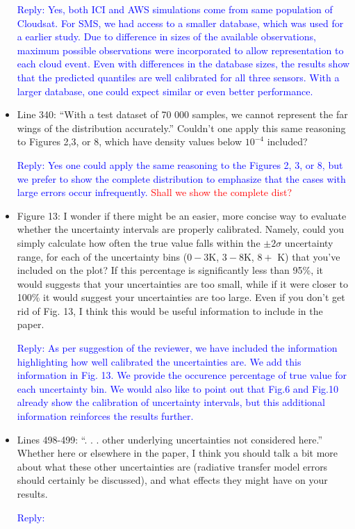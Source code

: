 \documentclass[11pt,a4paper,draft]{article}
\begin{document}
\begin{itemize}
\textcolor{blue}{Reply: Yes, both ICI and AWS simulations come from same population of Cloudsat. For SMS, we had access to a smaller database, which was used for a earlier study. Due to difference in sizes of the available observations, maximum possible observations were incorporated to allow  representation to each cloud event. Even with differences in the database sizes, the results show that the predicted quantiles are well calibrated for all three sensors. With a larger database, one could expect similar or even better performance.}

\item  
			Line 340: ``With a test dataset of 70 000 samples, we cannot represent the far wings of the distribution accurately.'' Couldn't one apply this same reasoning to Figures 2,3, or
			8, which have density values below $10^{-4}$ included?

\textcolor{blue}{Reply: Yes one could apply the same reasoning to the Figures 2, 3, or 8, but we prefer to show the complete distribution to emphasize that the cases with large errors occur infrequently. \textcolor{red}{Shall we show the complete dist?}}


\item 
			Figure 13: I wonder if there might be an easier, more concise way to evaluate whether
			the uncertainty intervals are properly calibrated. Namely, could you simply calculate
			how often the true value falls within the $\pm2\sigma$ uncertainty range, for each of the uncertainty bins ($0 - 3$K, $3 - 8$K, $8 +$ K) that you've included on the plot? If this percentage is significantly less than 95\%, it would suggests that your uncertainties are too small, while if it were closer to 100\% it would suggest your uncertainties are too large. Even if you don't get rid of Fig. 13, I think this would be useful information to include in the paper.

\textcolor{blue}{Reply: As per suggestion of the reviewer, we have included the information highlighting how well calibrated the uncertainties are. We add this information in Fig. 13. We provide the occurence percentage of true value for each uncertainty bin. We would also like to point out that Fig.6 and Fig.10 already show the calibration of uncertainty intervals, but this additional information reinforces the results further.} 

\item  
			Lines 498-499: ``. . . other underlying uncertainties not considered here.'' Whether here or elsewhere in the paper, I think you should talk a bit more about what these other uncertainties are (radiative transfer model errors should certainly be discussed), and what effects they might have on your results.

\textcolor{blue}{Reply:}

\end{itemize}
	
\end{document}
